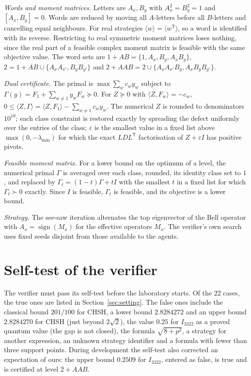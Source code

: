 \documentclass[10pt,twocolumn,a4paper]{article}
\theoremstyle{definition}
\theoremstyle{remark}
\newcommand{\ev}[1]{\langle #1\rangle}
\begin{document}
\emph{Words and moment matrices.} Letters are $A_x,B_y$ with $A_x^2=B_y^2=1$ and $[A_x,B_y]=0$. Words are reduced by moving all
$A$-letters before all $B$-letters and cancelling equal neighbours. For real strategies $\ev{w}=\ev{w^{\mathsf T}}$, so a word
is identified with its reverse. Restricting to real symmetric moment matrices loses nothing, since the real part of a feasible
complex moment matrix is feasible with the same objective value. The word sets are $1{+}AB=\{1,A_x,B_y,A_xB_y\}$,
$2=1{+}AB\cup\{A_xA_{x'},B_yB_{y'}\}$ and $2{+}AAB=2\cup\{A_xA_{x'}B_y,A_xB_yB_{y'}\}$.

\emph{Dual certificate.} The primal is $\max\sum_w c_w y_w$ subject to $\Gamma(y)=F_1+\sum_{w\ne1}y_wF_w\succeq0$. For
$Z\succeq0$ with $\langle Z,F_w\rangle=-c_w$, $0\le\langle Z,\Gamma\rangle=\langle Z,F_1\rangle-\sum_{w\ne1}c_wy_w$. The numerical
$Z$ is rounded to denominators $10^{10}$; each class constraint is restored exactly by spreading the defect uniformly over the
entries of the class; $\varepsilon$ is the smallest value in a fixed list above $\max(0,-\lambda_{\min})$ for which the exact
$LDL^{\mathsf T}$ factorisation of $Z+\varepsilon I$ has positive pivots.

\emph{Feasible moment matrix.} For a lower bound on the optimum of a level, the numerical primal $\Gamma$ is averaged over each
class, rounded, its identity class set to $1$, and replaced by $\Gamma_t=(1-t)\Gamma+tI$ with the smallest $t$ in a fixed list
for which $\Gamma_t\succ0$ exactly. Since $I$ is feasible, $\Gamma_t$ is feasible, and its objective is a lower bound.

\emph{Strategy.} The see-saw iteration alternates the top eigenvector of the Bell operator with $A_x=\operatorname{sign}(M_x)$ for
the effective operators $M_x$. The verifier's own search uses fixed seeds disjoint from those available to the agents.

\section{Self-test of the verifier}\label{app:self}

The verifier must pass its self-test before the laboratory starts. Of the 22 cases, the true ones are listed in
Section~\ref{sec:setting}. The false ones include the classical bound $201/100$ for CHSH, a lower bound $2.8284272$ and an upper
bound $2.8284270$ for CHSH (just beyond $2\sqrt2$), the value $0.25$ for $I_{3322}$ as a proved quantum value (the gap is not
closed), the formula $\sqrt{8+p^2}$, a strategy for another expression, an unknown strategy identifier and a formula with fewer
than three support points. During development the self-test also corrected an expectation of ours: the upper bound $0.2509$ for
$I_{3322}$, entered as false, is true and is certified at level $2{+}AAB$.
\end{document}
